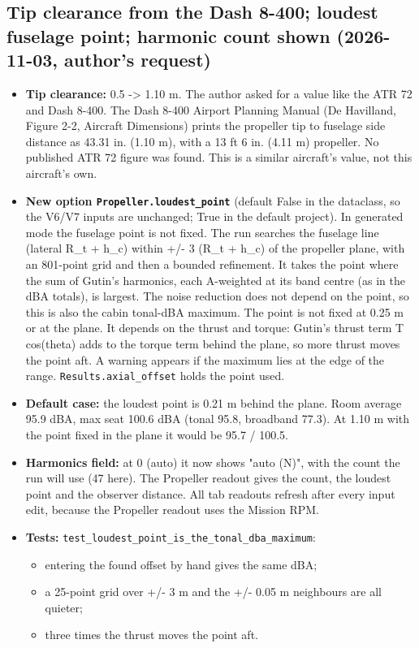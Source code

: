 \documentclass[10pt,a4paper]{article}
\begin{document}
\subsection*{Tip clearance from the Dash 8-400; loudest fuselage point; harmonic count shown (2026-11-03, author's request)}

\begin{itemize}
\item \textbf{Tip clearance:} 0.5 -> 1.10 m. The author asked for a value like the ATR 72 and Dash 8-400. The Dash 8-400 Airport Planning Manual (De Havilland, Figure 2-2, Aircraft Dimensions) prints the propeller tip to fuselage side distance as 43.31 in. (1.10 m), with a 13 ft 6 in. (4.11 m) propeller. No published ATR 72 figure was found. This is a similar aircraft's value, not this aircraft's own.
\item \textbf{New option \texttt{Propeller.\allowbreak{}loudest\_\allowbreak{}point}} (default False in the dataclass, so the V6/V7 inputs are unchanged; True in the default project). In generated mode the fuselage point is not fixed. The run searches the fuselage line (lateral R\_t + h\_c) within +/- 3 (R\_t + h\_c) of the propeller plane, with an 801-point grid and then a bounded refinement. It takes the point where the sum of Gutin's harmonics, each A-weighted at its band centre (as in the dBA totals), is largest. The noise reduction does not depend on the point, so this is also the cabin tonal-dBA maximum. The point is not fixed at 0.25 m or at the plane. It depends on the thrust and torque: Gutin's thrust term T cos(theta) adds to the torque term behind the plane, so more thrust moves the point aft. A warning appears if the maximum lies at the edge of the range. \texttt{Results.\allowbreak{}axial\_\allowbreak{}offset} holds the point used.
\item \textbf{Default case:} the loudest point is 0.21 m behind the plane. Room average 95.9 dBA, max seat 100.6 dBA (tonal 95.8, broadband 77.3). At 1.10 m with the point fixed in the plane it would be 95.7 / 100.5.
\item \textbf{Harmonics field:} at 0 (auto) it now shows "auto (N)", with the count the run will use (47 here). The Propeller readout gives the count, the loudest point and the observer distance. All tab readouts refresh after every input edit, because the Propeller readout uses the Mission RPM.
\item \textbf{Tests:} \texttt{test\_\allowbreak{}loudest\_\allowbreak{}point\_\allowbreak{}is\_\allowbreak{}the\_\allowbreak{}tonal\_\allowbreak{}dba\_\allowbreak{}maximum}:
\begin{itemize}
\item entering the found offset by hand gives the same dBA;
\item a 25-point grid over +/- 3 m and the +/- 0.05 m neighbours are all quieter;
\item three times the thrust moves the point aft.
\end{itemize}
\end{itemize}
\end{document}
